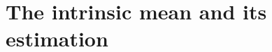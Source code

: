 \documentclass[journal]{../bib/IEEEtran}
\begin{document}




\section{The intrinsic mean and its estimation}\label{sec:unwr-mean-vari}
\end{document}
